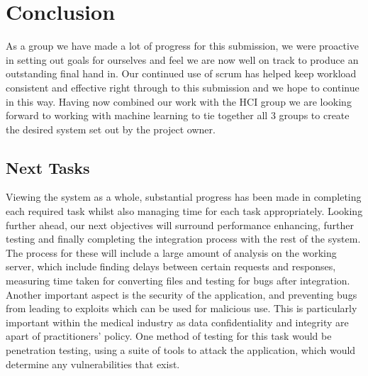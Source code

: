 \section{Conclusion}
As a group we have made a lot of progress for this submission, we were proactive in setting out goals for ourselves and feel we are now well on track to produce an outstanding final hand in. Our continued use of scrum has helped keep workload consistent and effective right through to this submission and we hope to continue in this way. Having now combined our work with the HCI group we are looking forward to working with machine learning to tie together all 3 groups to create the desired system set out by the project owner.

\subsection{Next Tasks}
Viewing the system as a whole, substantial progress has been made in completing each required task whilst also managing time for each task appropriately. Looking further ahead, our next objectives will surround performance enhancing, further testing and finally completing the integration process with the rest of the system. The process for these will include a large amount of analysis on the working server, which include finding delays between certain requests and responses, measuring time taken for converting files and testing for bugs after integration. Another important aspect is the security of the application, and preventing bugs from leading to exploits which can be used for malicious use. This is particularly important within the medical industry as data confidentiality and integrity are apart of practitioners' policy. One method of testing for this task would be penetration testing, using a suite of tools to attack the application, which would determine any vulnerabilities that exist.
